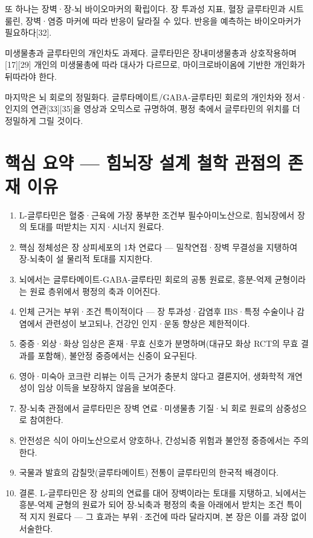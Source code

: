 \documentclass[12pt,oneside]{book}
\begin{document}
또 하나는 장벽·장-뇌 바이오마커의 확립이다. 장 투과성 지표, 혈장 글루타민과 시트룰린, 장벽·염증 마커에 따라 반응이 달라질 수 있다. 반응을 예측하는 바이오마커가 필요하다[32].

미생물총과 글루타민의 개인차도 과제다. 글루타민은 장내미생물총과 상호작용하며[17][29] 개인의 미생물총에 따라 대사가 다르므로, 마이크로바이옴에 기반한 개인화가 뒤따라야 한다.

마지막은 뇌 회로의 정밀화다. 글루타메이트/GABA-글루타민 회로의 개인차와 정서·인지의 연관[33][35]을 영상과 오믹스로 규명하여, 평정 축에서 글루타민의 위치를 더 정밀하게 그릴 것이다.

\section{핵심 요약 — 힘뇌장 설계 철학 관점의 존재 이유}

\begin{enumerate}[leftmargin=6mm,itemsep=1pt,topsep=2pt]
  \item L-글루타민은 혈중·근육에 가장 풍부한 조건부 필수아미노산으로, 힘뇌장에서 장의 토대를 떠받치는 지지·시너지 원료다.
  \item 핵심 정체성은 장 상피세포의 1차 연료다 — 밀착연접·장벽 무결성을 지탱하여 장-뇌축이 설 물리적 토대를 지지한다.
  \item 뇌에서는 글루타메이트-GABA-글루타민 회로의 공통 원료로, 흥분-억제 균형이라는 원료 층위에서 평정의 축과 이어진다.
  \item 인체 근거는 부위·조건 특이적이다 — 장 투과성·감염후 IBS·특정 수술이나 감염에서 관련성이 보고되나, 건강인 인지·운동 향상은 제한적이다.
  \item 중증·외상·화상 임상은 혼재·무효 신호가 분명하며(대규모 화상 RCT의 무효 결과를 포함해), 불안정 중증에서는 신중이 요구된다.
  \item 영아·미숙아 코크란 리뷰는 이득 근거가 충분치 않다고 결론지어, 생화학적 개연성이 임상 이득을 보장하지 않음을 보여준다.
  \item 장-뇌축 관점에서 글루타민은 장벽 연료·미생물총 기질·뇌 회로 원료의 삼중성으로 참여한다.
  \item 안전성은 식이 아미노산으로서 양호하나, 간성뇌증 위험과 불안정 중증에서는 주의한다.
  \item 국물과 발효의 감칠맛(글루타메이트) 전통이 글루타민의 한국적 배경이다.
  \item 결론. L-글루타민은 장 상피의 연료를 대어 장벽이라는 토대를 지탱하고, 뇌에서는 흥분-억제 균형의 원료가 되어 장-뇌축과 평정의 축을 아래에서 받치는 조건 특이적 지지 원료다 — 그 효과는 부위·조건에 따라 달라지며, 본 장은 이를 과장 없이 서술한다.
\end{enumerate}
\end{document}
